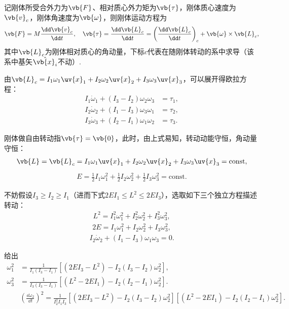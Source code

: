 记刚体所受合外力为\(\vb{F}\)、相对质心外力矩为\(\vb{\tau}\)，刚体质心速度为\(\vb{v}_c\)，刚体角速度为\(\vb{\omega}\)，则刚体运动方程为
\begin{align*}
	\vb{F} = M \frac{\dd \vb{v}_c}{\dd t}, \quad \vb{\tau} = \frac{\dd \vb{L}_c}{\dd t} = \left(\frac{\dd \vb{L}_c}{\dd t}\right)_c + \vb{\omega}\times\vb{L}_c,
\end{align*}
其中\(\vb{L}_c\)为刚体相对质心的角动量，下标\(c\)代表在随刚体转动的系中求导（该系中基矢\(\hat{\vb{x}_i}\)不动）.

由\(\vb{L}_c = I_1 \omega_1 \uv{x}_1 + I_2 \omega_2 \uv{x}_2 + I_3 \omega_3 \uv{x}_3\)，可以展开得欧拉方程：
\begin{align*}
	I_1 \dot{\omega}_1 + (I_3 - I_2)\omega_2\omega_3 & = \tau_1, \\
	I_2 \dot{\omega}_2 + (I_1 - I_3)\omega_3\omega_1 & = \tau_2, \\
	I_3 \dot{\omega}_3 + (I_2 - I_1)\omega_1\omega_2 & = \tau_3.
\end{align*}

刚体做自由转动指\(\vb{\tau} = \vb{0}\)，此时，由上式易知，转动动能守恒，角动量守恒：
\begin{align*}
	\vb{L} = \vb{L}_c = I_1 \omega_1 \uv{x}_1 + I_2 \omega_2 \uv{x}_2 + I_3 \omega_3 \uv{x}_3 = \text{const},
\end{align*}
\begin{align*}
	E = \frac{1}{2}I_1\omega_1^2 + \frac{1}{2}I_2\omega_2^2 + \frac{1}{2}I_3\omega_3^2 = \text{const}.
\end{align*}

不妨假设\(I_3 \geq I_2 \geq I_1\)（进而下式\(2EI_1 \leq L^2 \leq 2EI_3\)），选取如下三个独立方程描述转动：
\begin{align*}
	L^2 = I_1^2\omega_1^2 + I_2^2\omega_2^2 + I_3^2\omega_3^2,
\end{align*}
\begin{align*}
	2E = I_1\omega_1^2 + I_2\omega_2^2 + I_3\omega_3^2,
\end{align*}
\begin{align*}
	I_2 \dot{\omega}_2 + (I_1 - I_3)\omega_1\omega_3 = 0.
\end{align*}

给出
\begin{align*}
	\omega_1^2 &= \frac{1}{I_1(I_3-I_1)}\left[(2EI_3 - L^2) - I_2(I_3-I_2)\omega_2^2\right],\\
	\omega_3^2 &= \frac{1}{I_3(I_3-I_1)}\left[(L^2 - 2EI_1) - I_2(I_2-I_1)\omega_2^2\right].\\
	&\left(\frac{\dd \omega_2}{\dd t}\right)^2 = \frac{1}{I_2^2 I_1 I_3}\left[(2EI_3 - L^2) - I_2(I_3-I_2)\omega_2^2\right]\left[(L^2 - 2EI_1) - I_2(I_2-I_1)\omega_2^2\right].
\end{align*}

